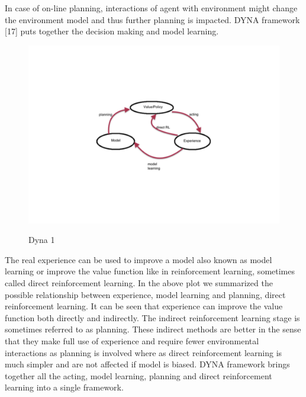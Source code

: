 \documentclass[MTech]{iitmdiss}
\begin{document}
In case of on-line planning, interactions of agent with environment might change the environment model and thus further planning is impacted. DYNA framework [17] puts together the decision making and model learning.
\begin{figure}[htpb]
   \begin{center}
     \resizebox{120mm}{120mm} {\includegraphics {dyna1}}
     \caption {Dyna 1 }
   \label{fig:dyna-1}
   \end{center}
 \end{figure}
The real experience can be used to improve a model also known as model learning or improve the value function like in reinforcement learning, sometimes called direct reinforcement learning. In the above plot we summarized the possible relationship between experience, model learning and planning, direct reinforcement learning. It can be seen that experience can improve the value function both directly and indirectly. The indirect reinforcement learning stage is sometimes referred to as planning. These indirect methods are better in the sense that they make full use of experience and require fewer environmental interactions as planning is involved where as direct reinforcement learning is much simpler and are not affected if model is biased. DYNA framework brings together all the acting, model learning, planning and direct reinforcement learning into a single framework.
\end{document}
